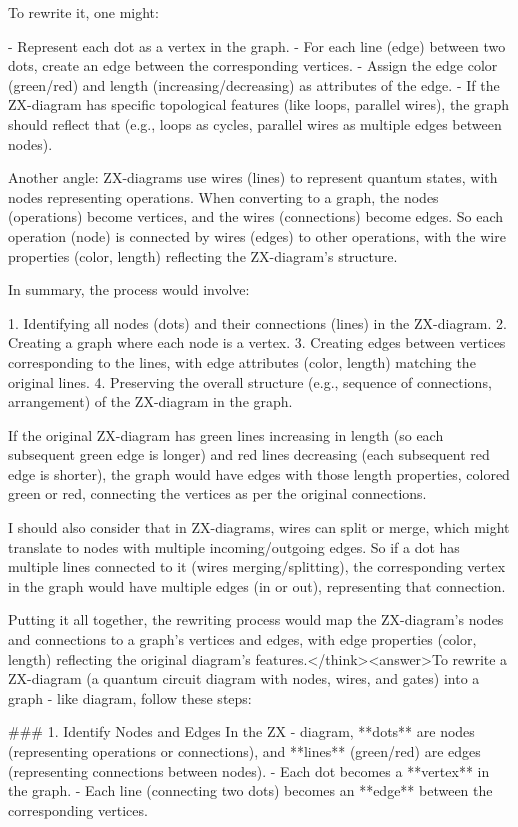 To rewrite it, one might:

- Represent each dot as a vertex in the graph.
- For each line (edge) between two dots, create an edge between the corresponding vertices.
- Assign the edge color (green/red) and length (increasing/decreasing) as attributes of the edge.
- If the ZX-diagram has specific topological features (like loops, parallel wires), the graph should reflect that (e.g., loops as cycles, parallel wires as multiple edges between nodes).

Another angle: ZX-diagrams use wires (lines) to represent quantum states, with nodes representing operations. When converting to a graph, the nodes (operations) become vertices, and the wires (connections) become edges. So each operation (node) is connected by wires (edges) to other operations, with the wire properties (color, length) reflecting the ZX-diagram's structure.

In summary, the process would involve:

1. Identifying all nodes (dots) and their connections (lines) in the ZX-diagram.
2. Creating a graph where each node is a vertex.
3. Creating edges between vertices corresponding to the lines, with edge attributes (color, length) matching the original lines.
4. Preserving the overall structure (e.g., sequence of connections, arrangement) of the ZX-diagram in the graph.

If the original ZX-diagram has green lines increasing in length (so each subsequent green edge is longer) and red lines decreasing (each subsequent red edge is shorter), the graph would have edges with those length properties, colored green or red, connecting the vertices as per the original connections.

I should also consider that in ZX-diagrams, wires can split or merge, which might translate to nodes with multiple incoming/outgoing edges. So if a dot has multiple lines connected to it (wires merging/splitting), the corresponding vertex in the graph would have multiple edges (in or out), representing that connection.

Putting it all together, the rewriting process would map the ZX-diagram's nodes and connections to a graph's vertices and edges, with edge properties (color, length) reflecting the original diagram's features.</think><answer>To rewrite a ZX-diagram (a quantum circuit diagram with nodes, wires, and gates) into a graph - like diagram, follow these steps:  


### 1. Identify Nodes and Edges  
In the ZX - diagram, **dots** are nodes (representing operations or connections), and **lines** (green/red) are edges (representing connections between nodes).  
- Each dot becomes a **vertex** in the graph.  
- Each line (connecting two dots) becomes an **edge** between the corresponding vertices.    


